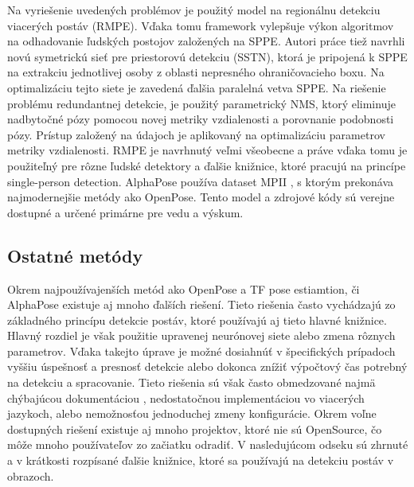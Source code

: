 \documentclass[slovak,master,dept460,male,cpp,cpdeclaration]{diploma}
\begin{document}
Na vyriešenie uvedených problémov je použitý model na regionálnu detekciu viacerých postáv (RMPE). Vďaka tomu
framework vylepšuje výkon algoritmov na odhadovanie ľudských postojov založených na SPPE. Autori práce tiež navrhli novú
symetrickú sieť pre priestorovú detekciu (SSTN), ktorá je pripojená k SPPE na extrakciu jednotlivej osoby z
oblasti nepresného ohraničovacieho boxu. Na optimalizáciu tejto siete je zavedená ďalšia paralelná vetva SPPE. Na riešenie problému redundantnej detekcie, je použitý parametrický NMS, ktorý eliminuje nadbytočné pózy pomocou novej metriky vzdialenosti a porovnanie podobnosti pózy. Prístup založený na údajoch je
aplikovaný na optimalizáciu parametrov metriky vzdialenosti. RMPE je navrhnutý veľmi všeobecne a práve vďaka tomu je použiteľný pre rôzne ľudské detektory a ďalšie knižnice, ktoré pracujú na princípe single-person detection. AlphaPose používa dataset MPII , s ktorým prekonáva najmodernejšie metódy ako OpenPose. Tento model a zdrojové kódy\cite{githubAlphaPose} sú verejne dostupné a určené primárne pre vedu a výskum.

\newpage
\subsection{Ostatné metódy}
Okrem  najpoužívajenších metód ako OpenPose a TF pose estiamtion, či AlphaPose existuje aj mnoho ďalších riešení. Tieto riešenia často vychádzajú zo základného princípu detekcie postáv, ktoré používajú aj tieto hlavné knižnice. Hlavný rozdiel je však použitie upravenej neurónovej siete alebo zmena rôznych parametrov. Vďaka takejto úprave je možné dosiahnúť v špecifických prípadoch vyššiu úspešnosť a presnosť detekcie alebo dokonca znížiť výpočtový čas potrebný na detekciu a spracovanie. Tieto riešenia sú však často obmedzované najmä chýbajúcou dokumentáciou , nedostatočnou implementáciou vo viacerých jazykoch, alebo nemožnosťou jednoduchej zmeny konfigurácie. Okrem voľne dostupných riešení existuje aj mnoho projektov, ktoré nie sú OpenSource, čo môže mnoho používateľov zo začiatku odradiť. V nasledujúcom odseku sú zhrnuté a v krátkosti rozpísané ďalšie knižnice, ktoré sa používajú na detekciu postáv v obrazoch.
\end{document}
